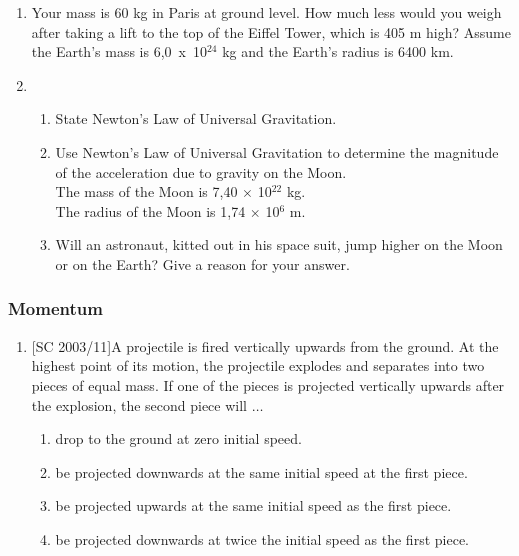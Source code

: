\begin{eocexercises}{}
\begin{enumerate}
\item {Your mass is 60 kg in Paris at ground level.  How much less would you weigh after taking a lift to the top of the Eiffel Tower, which is 405 m high? Assume the Earth's mass is 6,0~x~10$^{24}$ kg and the Earth's radius is 6400 km.}

\item { \begin{enumerate}
\item{State Newton's Law of Universal Gravitation.}
\item{Use Newton's Law of Universal Gravitation to determine the magnitude of the acceleration due to 	gravity on the Moon.\\
The mass of the Moon is 7,40 $\times$ 10$^{22}$ kg.\\
The radius of the Moon is 1,74 $\times$ 10$^6$ m.\\}
\item{Will an astronaut, kitted out in his space suit, jump higher on the Moon or on the Earth? Give a reason for your answer.
}
\end{enumerate}
}

\end{enumerate}


\subsubsection{Momentum}
\begin{enumerate}
\item{[SC 2003/11]A projectile is fired vertically upwards from the ground. At the highest point of its motion, the projectile explodes and separates into two pieces of equal mass. If one of the pieces is projected vertically upwards after the explosion, the second piece will $\ldots$
\begin{enumerate}
\item {drop to the ground at zero initial speed.}
\item {be projected downwards at the same initial speed at the first piece.}
\item {be projected upwards at the same initial speed as the first piece.}
\item {be projected downwards at twice the initial speed as the first piece.}
\end{enumerate}}


\end{enumerate}
\end{eocexercises}
